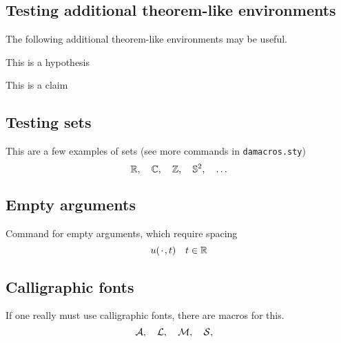 \documentclass[a4paper]{siamart190516}
\begin{document}
\subsection{Testing additional theorem-like environments} The following additional
theorem-like environments may be useful.

\begin{hypothesis} \label{hyp:trivial}
  This is a hypothesis
\end{hypothesis}

\begin{claim} \label{clm:trivial}
  This is a claim
\end{claim}

\subsection{Testing sets}
This are a few examples of sets (see more commands in \texttt{damacros.sty})
\[
  \mathbb{R}, \quad
  \mathbb{C}, \quad
  \mathbb{Z}, \quad
  \mathbb{S}^2, \quad
  \ldots
\]

\subsection{Empty arguments}
Command for empty arguments, which require spacing
\[
  u({\mkern 2mu\cdot\mkern 2mu},t) \quad t \in \mathbb{R}
\]

\subsection{Calligraphic fonts}
If one really must use calligraphic fonts, there are macros for this.
\[
  \mathcal{A}, \quad
  \mathcal{L}, \quad
  \mathcal{M}, \quad
  \mathcal{S}, \quad
\]




\end{document}
